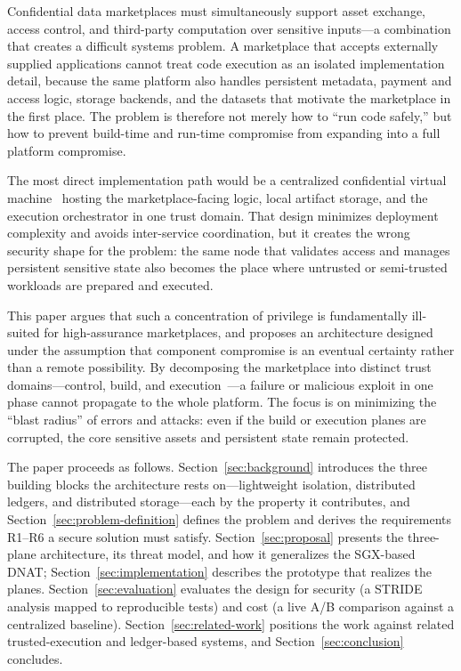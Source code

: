 \documentclass[runningheads]{llncs}
\begin{document}

Confidential data marketplaces must simultaneously support asset exchange,
access control, and third-party computation over sensitive inputs---a
combination that creates a difficult systems problem. A marketplace that
accepts externally supplied applications cannot treat code execution as an
isolated implementation detail, because the same platform also handles
persistent metadata, payment and access logic, storage backends, and the
datasets that motivate the marketplace in the first place. The problem is
therefore not merely how to ``run code safely,'' but how to prevent build-time
and run-time compromise from expanding into a full platform compromise.

The most direct implementation path would be a centralized confidential
virtual machine~\cite{amd2020sevsnp} hosting the marketplace-facing logic,
local artifact storage, and the execution orchestrator in one trust domain.
That design minimizes deployment complexity and avoids inter-service
coordination, but it creates the wrong security shape for the problem: the
same node that validates access and manages persistent sensitive state also
becomes the place where untrusted or semi-trusted workloads are prepared and
executed.

This paper argues that such a concentration of privilege is fundamentally
ill-suited for high-assurance marketplaces, and proposes an architecture
designed under the assumption that component compromise is an eventual
certainty rather than a remote possibility. By decomposing the marketplace
into distinct trust domains---control, build, and
execution~\cite{nascimento2020dnat}---a failure or malicious exploit in one
phase cannot propagate to the whole platform. The focus is on minimizing the
``blast radius'' of errors and attacks: even if the build or execution planes
are corrupted, the core sensitive assets and persistent state remain
protected.

The paper proceeds as follows. Section~\ref{sec:background} introduces the
three building blocks the architecture rests on---lightweight isolation,
distributed ledgers, and distributed storage---each by the property it
contributes, and Section~\ref{sec:problem-definition} defines the problem and
derives the requirements R1--R6 a secure solution must satisfy.
Section~\ref{sec:proposal} presents the three-plane architecture, its threat
model, and how it generalizes the SGX-based DNAT;
Section~\ref{sec:implementation} describes the prototype that realizes the
planes. Section~\ref{sec:evaluation} evaluates the design for security (a
STRIDE analysis mapped to reproducible tests) and cost (a live A/B comparison
against a centralized baseline). Section~\ref{sec:related-work} positions the
work against related trusted-execution and ledger-based systems, and
Section~\ref{sec:conclusion} concludes.
\end{document}
